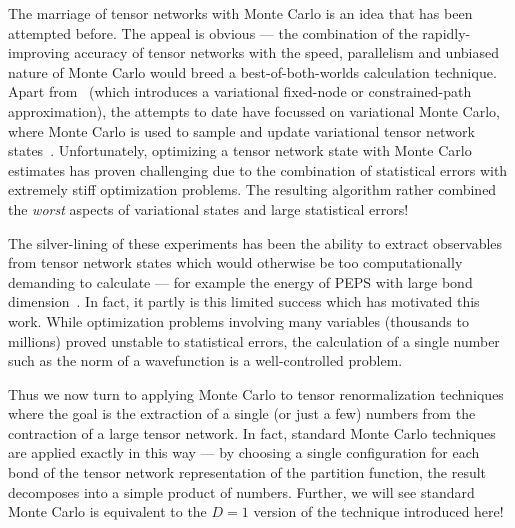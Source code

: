 \documentclass[aps,prl,nopacs,twocolumn]{revtex4}
\begin{document}
The marriage of tensor networks with Monte Carlo is an idea that has been attempted before. The appeal is obvious --- the combination of the rapidly-improving accuracy of tensor networks with the speed, parallelism and unbiased nature of Monte Carlo would breed a best-of-both-worlds calculation technique. Apart from~\cite{Wouters2014} (which introduces a variational fixed-node or constrained-path approximation), the attempts to date have focussed on variational Monte Carlo, where Monte Carlo is used to sample and update variational tensor network states~\cite{Sandvik2007,Wang2011,Ferris2012,Ferris2012b,Iblisdir2014,Sikora2015}. Unfortunately, optimizing a tensor network state with Monte Carlo estimates has proven challenging due to the combination of statistical errors with extremely stiff optimization problems. The resulting algorithm rather combined the \emph{worst} aspects of variational states and large statistical errors!

The silver-lining of these experiments has been the ability to extract observables from tensor network states which would otherwise be too computationally demanding to calculate --- for example the energy of PEPS with large bond dimension~\cite{Wang2011}. %
In fact, it partly is this limited success which has motivated this work. While optimization problems involving many variables (thousands to millions) proved unstable to statistical errors, the calculation of a single number such as the norm of a wavefunction is a well-controlled problem.

Thus we now turn to applying Monte Carlo to tensor renormalization techniques where the goal is the extraction of a single (or just a few) numbers from the contraction of a large tensor network. In fact, standard Monte Carlo techniques are applied exactly in this way --- by choosing a single configuration for each bond of the tensor network representation of the partition function, the result decomposes into a simple product of numbers. Further, we will see standard Monte Carlo is equivalent to the $D=1$ version of the technique introduced here!
\end{document}
